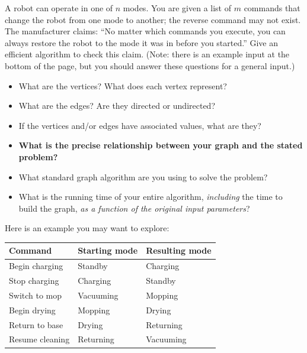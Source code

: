 \documentclass[11pt]{article}
\begin{document}
\noindent 
A robot can operate in one of $n$ modes. You are given a list of $m$ commands that change
the robot from one mode to another; the reverse command may not exist.
The
manufacturer claims: ``No matter which commands you execute, you can always
restore the robot to the mode it was in before you started.'' 
Give an efficient algorithm to check this claim. (Note: there is an example input
at the bottom of the page, but you should answer these questions for a general input.)

\begin{itemize}\itemsep40pt
\item What are the vertices?  What does each vertex represent?
\item What are the edges?  Are they directed or undirected?
\item If the vertices and/or edges have associated values, what are they?
\item \textbf{What is the precise relationship between your graph and the stated problem?}
\item What standard graph algorithm are you using to solve the problem?
\item What is the running time of your entire algorithm, \emph{including} the time to build the graph, \emph{as a function of the original input parameters}?
\end{itemize}

\vspace{1in}


Here is an example you may want to explore:

\begin{center}
\begin{tabular}{lll}
\hline
Command & Starting mode & Resulting mode \\
\hline
Begin charging  & Standby   & Charging  \\
Stop charging   & Charging  & Standby   \\
Switch to mop   & Vacuuming & Mopping   \\
Begin drying    & Mopping   & Drying    \\
Return to base  & Drying    & Returning \\
Resume cleaning & Returning & Vacuuming \\
\hline
\end{tabular}
\end{center}





\end{document}

